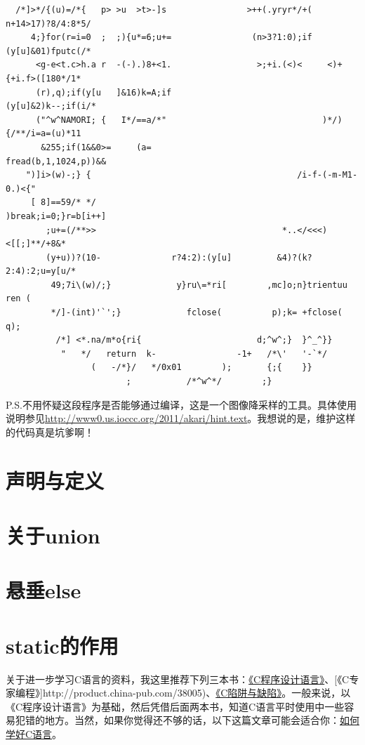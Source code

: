 \documentclass[a4paper]{book}
\begin{document}
{\begin{shaded}
\begin{verbatim}
  /*]>*/{(u)=/*{   p> >u  >t>-]s                >++(.yryr*/+(    n+14>17)?8/4:8*5/
     4;}for(r=i=0  ;  ;){u*=6;u+=                (n>3?1:0);if    (y[u]&01)fputc(/*
      <g-e<t.c>h.a r  -(-).)8+<1.                 >;+i.(<)<     <)+{+i.f>([180*/1*
      (r),q);if(y[u   ]&16)k=A;if                               (y[u]&2)k--;if(i/*
      ("^w^NAMORI; {   I*/==a/*"                               )*/){/**/i=a=(u)*11
       &255;if(1&&0>=     (a=                                 fread(b,1,1024,p))&&
	")]i>(w)-;} {                                         /i-f-(-m-M1-0.)<{"
	 [ 8]==59/* */                                       )break;i=0;}r=b[i++]
	    ;u+=(/**>>                                     *..</<<<)<[[;]**/+8&*
	    (y+u))?(10-              r?4:2):(y[u]         &4)?(k?2:4):2;u=y[u/*
	     49;7i\(w)/;}             y}ru\=*ri[        ,mc]o;n}trientuu ren (
	     */]-(int)'`';}             fclose(          p);k= +fclose( q);
	      /*] <*.na/m*o{ri{                       d;^w^;}  }^_^}}
	       "   */   return  k-                -1+   /*\'   '-`*/
	             (   -/*}/   */0x01        );       {;{    }}
	                    ;           /*^w^*/        ;}
\end{verbatim}\end{shaded}}
P.S.不用怀疑这段程序是否能够通过编译，这是一个图像降采样的工具。具体使用说明参见\url{http://www0.us.ioccc.org/2011/akari/hint.text}。我想说的是，维护这样的代码真是坑爹啊！

\section{声明与定义}

\section{关于union}

\section{悬垂else}

\section{static的作用}

关于进一步学习C语言的资料，我这里推荐下列三本书：\href{http://product.china-pub.com/14975\&ref=browse}{《C程序设计语言》}、{[}《C专家编程》{]}http://product.china-pub.com/38005)、\href{http://product.china-pub.com/38125}{《C陷阱与缺陷》}。一般来说，以《C程序设计语言》为基础，然后凭借后面两本书，知道C语言平时使用中一些容易犯错的地方。当然，如果你觉得还不够的话，以下这篇文章可能会适合你：\href{http://coolshell.cn/articles/4102.html}{如何学好C语言}。
\end{document}
